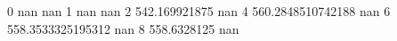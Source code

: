 0 nan nan
1 nan nan
2 542.169921875 nan
4 560.2848510742188 nan
6 558.3533325195312 nan
8 558.6328125 nan
